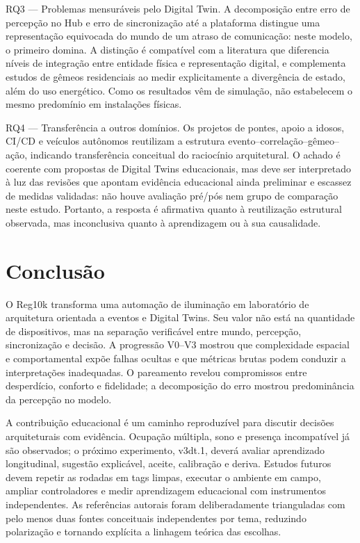 \documentclass[10pt,a4paper]{article}
\begin{document}
RQ3 — Problemas mensuráveis pelo Digital Twin. A decomposição entre erro de percepção no Hub e erro de sincronização até a plataforma distingue uma representação equivocada do mundo de um atraso de comunicação: neste modelo, o primeiro domina. A distinção é compatível com a literatura que diferencia níveis de integração entre entidade física e representação digital, e complementa estudos de gêmeos residenciais ao medir explicitamente a divergência de estado, além do uso energético. Como os resultados vêm de simulação, não estabelecem o mesmo predomínio em instalações físicas. \citep{kritzinger2018,tao2019,fujii2022}

RQ4 — Transferência a outros domínios. Os projetos de pontes, apoio a idosos, CI/CD e veículos autônomos reutilizam a estrutura evento--correlação--gêmeo--ação, indicando transferência conceitual do raciocínio arquitetural. O achado é coerente com propostas de Digital Twins educacionais, mas deve ser interpretado à luz das revisões que apontam evidência educacional ainda preliminar e escassez de medidas validadas: não houve avaliação pré/pós nem grupo de comparação neste estudo. Portanto, a resposta é afirmativa quanto à reutilização estrutural observada, mas inconclusiva quanto à aprendizagem ou à sua causalidade. \citep{brandao2026,harris2026,coombs2026}


\section{Conclusão}

O Reg10k transforma uma automação de iluminação em laboratório de arquitetura orientada a eventos e Digital Twins. Seu valor não está na quantidade de dispositivos, mas na separação verificável entre mundo, percepção, sincronização e decisão. A progressão V0--V3 mostrou que complexidade espacial e comportamental expõe falhas ocultas e que métricas brutas podem conduzir a interpretações inadequadas. O pareamento revelou compromissos entre desperdício, conforto e fidelidade; a decomposição do erro mostrou predominância da percepção no modelo.

A contribuição educacional é um caminho reproduzível para discutir decisões arquiteturais com evidência. Ocupação múltipla, sono e presença incompatível já são observados; o próximo experimento, v3dt.1, deverá avaliar aprendizado longitudinal, sugestão explicável, aceite, calibração e deriva. Estudos futuros devem repetir as rodadas em tags limpas, executar o ambiente em campo, ampliar controladores e medir aprendizagem educacional com instrumentos independentes. As referências autorais foram deliberadamente trianguladas com pelo menos duas fontes conceituais independentes por tema, reduzindo polarização e tornando explícita a linhagem teórica das escolhas.
\end{document}
